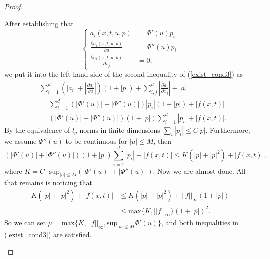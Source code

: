 \documentclass[11pt, a4paper]{article}
\begin{document}
\begin{proof}
\begin{enumerate}[a)]
	After establishing that
	\begin{equation*}
		\begin{cases}
			a_i(x,t,u,p) &= \Phi'(u)p_i \\
			\frac{\partial a_i(x,t,u,p)}{\partial u} &= \Phi''(u)p_i \\
			\frac{\partial a_i(x,t,u,p)}{\partial x_j} &= 0,
		\end{cases}	
	\end{equation*}
	we put it into the left hand side of the second inequality of (\ref{exist_cond3}) as
	\begin{align*}
	&\sum_{i=1}^d\left( |a_i| + \left| \frac{\partial a_i}{\partial u}\right| \right)(1+|p|) + \sum_{i,j}^d\left| \frac{\partial a_i}{\partial x_j} \right| + |a| \\
	&= \sum_{i=1}^d\left( |\Phi'(u)| + |\Phi''(u)| \right)|p_i|(1+|p|) + |f(x,t)| \\
	&= (|\Phi'(u)| + |\Phi''(u)|)(1+|p|)\sum_{i=1}^d|p_i| + |f(x,t)|.
	\end{align*}
	By the equivalence of $l_p$-norms in finite dimensions $\sum_i |p_i| \leq C|p|$. Furthermore, we assume $\Phi''(u)$ to be continuous for $|u|\leq M$, then
	\begin{equation*}
	(|\Phi'(u)| + |\Phi''(u)|)(1+|p|)\sum_{i=1}^d|p_i| + |f(x,t)| \leq K(|p| + |p|^2) + |f(x,t)|,
	\end{equation*}
	where $K = C\cdot \text{sup}_{|u|\leq M}(|\Phi'(u)| + |\Phi''(u)|)$. Now we are almost done. All that remains is noticing that
	\begin{align*}
	K(|p| + |p|^2) + |f(x,t)| &\leq K(|p| + |p|^2) + ||f||_{\infty}(1+|p|) \\
	&\leq \text{max}\{ K, ||f||_\infty \} (1+|p|)^2.
	\end{align*}
	So we can set $\mu = \text{max}\{K, ||f||_\infty, \text{sup}_{|u|\leq M}\Phi'(u) \}$, and both inequalities in (\ref{exist_cond3}) are satisfied.
	

\end{enumerate}
\end{proof}
\end{document}
